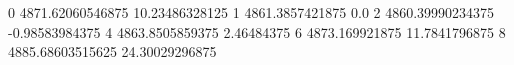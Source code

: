 0 4871.62060546875 10.23486328125
1 4861.3857421875 0.0
2 4860.39990234375 -0.98583984375
4 4863.8505859375 2.46484375
6 4873.169921875 11.7841796875
8 4885.68603515625 24.30029296875
